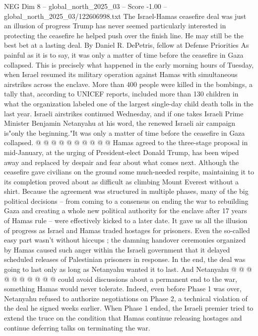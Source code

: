 \begin{textsample}{NEG Dim 8 – global\_north\_2025\_03 – Score -1.00 – global\_north\_2025\_03/122606998.txt}  \label{ex:f8_neg_358}
The Israel-Hamas ceasefire deal was just an illusion of progress Trump has never seemed particularly interested in protecting the ceasefire he helped push over the finish line.
He may still be the best bet at a lasting deal.
By Daniel R.
DePetris, fellow at Defense Priorities As painful as it is to say, it was only a matter of time before the ceasefire in Gaza collapsed.
This is precisely what happened in the early morning hours of Tuesday, when Israel resumed its military operation against Hamas with simultaneous airstrikes across the enclave.
More than 400 people were killed in the bombings, a tally that, according to UNICEF reports, included more than 130 children in what the organization labeled one of the largest single-day child death tolls in the last year.
Israeli airstrikes continued Wednesday, and if one takes Israeli Prime Minister Benjamin Netanyahu at his word, the renewed Israeli air campaign is"only the beginning."It was only a matter of time before the ceasefire in Gaza collapsed. @ @ @ @ @ @ @ @ @ @ Hamas agreed to the three-stage proposal in mid-January, at the urging of President-elect Donald Trump, has been wiped away and replaced by despair and fear about what comes next.
Although the ceasefire gave civilians on the ground some much-needed respite, maintaining it to its completion proved about as difficult as climbing Mount Everest without a shirt.
Because the agreement was structured in multiple phases, many of the big political decisions -- from coming to a consensus on ending the war to rebuilding Gaza and creating a whole new political authority for the enclave after 17 years of Hamas rule -- were effectively kicked to a later date.
It gave us all the illusion of progress as Israel and Hamas traded hostages for prisoners.
Even the so-called easy part wasn't without hiccups ; the damning handover ceremonies organized by Hamas caused such anger within the Israeli government that it delayed scheduled releases of Palestinian prisoners in response.
In the end, the deal was going to last only as long as Netanyahu wanted it to last.
And Netanyahu @ @ @ @ @ @ @ @ @ @ could avoid discussions about a permanent end to the war, something Hamas would never tolerate.
Indeed, even before Phase 1 was over, Netanyahu refused to authorize negotiations on Phase 2, a technical violation of the deal he signed weeks earlier.
When Phase 1 ended, the Israeli premier tried to extend the truce on the condition that Hamas continue releasing hostages and continue deferring talks on terminating the war.

\end{textsample}
